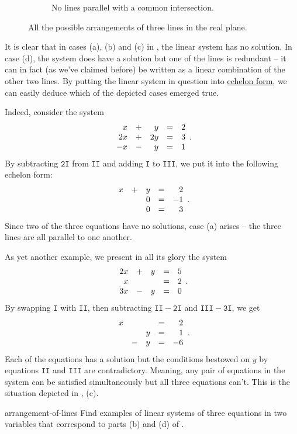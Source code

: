 \begin{figure}[ht]
\begin{subfigure}[t]{.45\textwidth}
  \caption{No lines parallel with a common intersection.}
 \end{subfigure}
 \caption{All the possible arrangements of three lines in the real plane.}
 \label{fig:arrangement-of-lines}
\end{figure}

It is clear that in cases (a), (b) and (c) in
, the linear system has no solution. In
case (d), the system does have a solution but one of the lines is redundant --
it can in fact (as we've claimed before) be written as a linear combination of
the other two lines. By putting the linear system in question into
\hyperref[def:echelon-form]{echelon form}, we can easily deduce which of the
depicted cases emerged true.

Indeed, consider the system
\[
 \begin{array}{r c r c r}
  x & + & y & = & 2\\
  2x & + & 2y & = & 3\\
  -x & - & y & = & 1
 \end{array}.
\]
By subtracting $\mathtt{2I}$ from $\mathtt{II}$ and adding $\mathtt{I}$ to
$\mathtt{III}$, we put it into the following echelon form:
\[
 \begin{array}{r c r c r}
  x & + & y & = & 2\\
    & & 0 & = & -1\\
    & & 0 & = & 3
 \end{array}.
\]
Since two of the three equations have no solutions, case (a) arises -- the three
lines are all parallel to one another.

As yet another example, we present in all its glory the system
\[
 \begin{array}{r c r c r}
  2x & + & y & = & 5\\
  x & & & = & 2\\
  3x & - & y & = & 0
 \end{array}.
\]
By swapping $\mathtt{I}$ with $\mathtt{II}$, then subtracting $\mathtt{II} -
\mathtt{2I}$ and $\mathtt{III} - \mathtt{3I}$, we get
\[
 \begin{array}{r c r c r}
  x & & & = & 2\\
  & & y & = & 1\\
  & - & y & = & -6
 \end{array}.
\]
Each of the equations has a solution but the conditions bestowed on $y$ by
equations $\mathtt{II}$ and $\mathtt{III}$ are contradictory. Meaning, any pair
of equations in the system can be satisfied simultaneously but all three
equations can't. This is the situation depicted in
, (c).

\begin{exercise}{}{arrangement-of-lines}
 Find examples of linear systems of three equations in two variables that
 correspond to parts (b) and (d) of .
\end{exercise}
